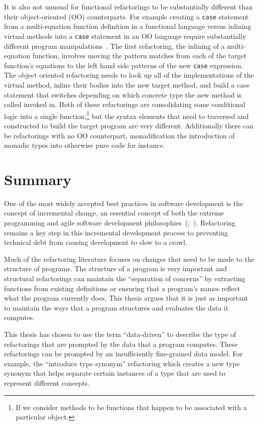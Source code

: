 It is also not unusual for functional refactorings to be substantially different than their object-oriented (OO) counterparts. For example creating a \texttt{case} statement from a multi-equation function definition in a functional language versus inlining virtual methods into a \texttt{case} statement in an OO language require substantially different program manipulations~\citep{huiqingThesis}. The first refactoring, the inlining of a multi-equation function, involves moving the pattern matches from each of the target function's equations to the left hand side patterns of the new \texttt{case} expression. The object oriented refactoring needs to look up all of the implementations of the virtual method, inline their bodies into the new target method, and build a case statement that switches depending on which concrete type the new method is called invoked in. Both of these refactorings are consolidating some conditional logic into a single function,\footnote{If we consider methods to be functions that happen to be associated with a particular object.} but the syntax elements that need to traversed and constructed to build the target program are very different. Additionally there can be refactorings with no OO counterpart, monadification the introduction of monadic types into otherwise pure code for instance.

\section{Summary}

One of the most widely accepted best practices in software development is the concept of incremental change, an essential concept of both the extreme programming and agile software development philosophies~(\cite{extremeProg};~\cite{agileManifesto}). Refactoring remains a key step in this incremental development process to preventing technical debt from causing development to slow to a crawl.

Much of the refactoring literature focuses on changes that need to be made to the structure of programs. The structure of a program is very important and structural refactorings can maintain the ``separation of concerns'' by extracting functions from existing definitions or ensuring that a program's names reflect what the program currently does. This thesis argues that it is just as important to maintain the ways that a program structures and evaluates the data it computes.

This thesis has chosen to use the term ``data-driven'' to describe the type of refactorings that are prompted by the data that a program computes. These refactorings can be prompted by an insufficiently fine-grained data model. For example, the ``introduce type synonym'' refactoring which creates a new type synonym that helps separate certain instances of a type that are used to represent different concepts.

